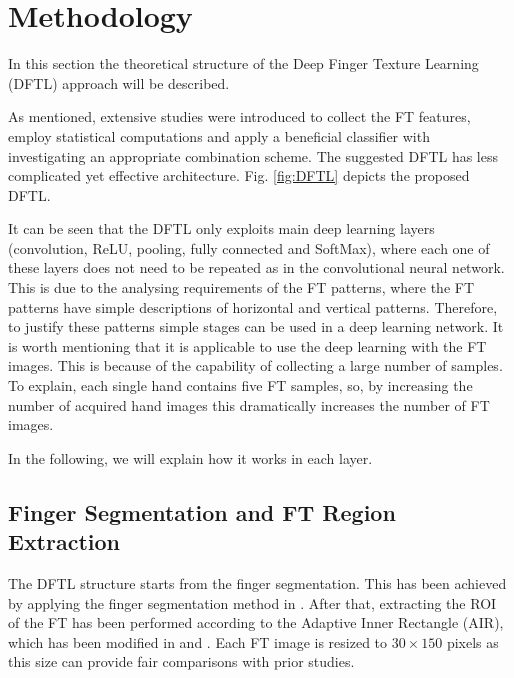 \documentclass[conference]{IEEEtran}
\begin{document}
\section{Methodology}
In this section the theoretical structure of the Deep Finger Texture Learning (DFTL) approach will be described. 

As mentioned, extensive studies were introduced to collect the FT features, employ statistical computations and apply a beneficial classifier with investigating an appropriate combination scheme. The suggested DFTL has less complicated yet effective architecture. Fig. \ref{fig:DFTL} depicts the proposed DFTL.

It can be seen that the DFTL only exploits main deep learning layers (convolution, ReLU, pooling, fully connected and SoftMax), where each one of these layers does not need to be repeated as in the convolutional neural network. This is due to the analysing requirements of the FT patterns, where the FT patterns have simple descriptions of horizontal and vertical patterns. Therefore, to justify these patterns simple stages can be used in a deep learning network. It is worth mentioning that it is applicable to use the deep learning with the FT images. This is because of the capability of collecting a large number of samples. To explain, each single hand contains five FT samples, so, by increasing the number of acquired hand images this dramatically increases the number of FT images. 

In the following, we will explain how it works in each layer.

\subsection{Finger Segmentation and FT Region Extraction}
The DFTL structure starts from the finger segmentation. This has been achieved by applying the finger segmentation method in \cite{Al-Nima2017Robust}. After that, extracting the ROI of the FT has been performed according to the Adaptive Inner Rectangle (AIR), which has been modified in \cite{Al-Nima2017Robust} and \cite{Al-Nima2017efficient}. Each FT image is resized to $30 \times 150$ pixels as this size can provide fair comparisons with prior studies.
\end{document}
